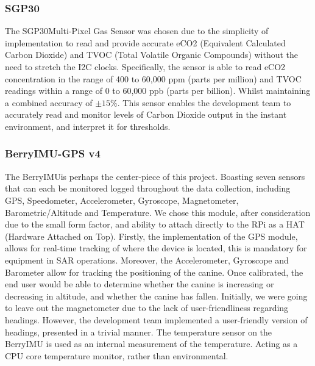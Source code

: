 \documentclass{ueacmpstyle}
\begin{document}
            
            \subsubsection{SGP30}
            The SGP30\footnotemark[2] Multi-Pixel Gas Sensor was chosen due to the simplicity of implementation to read and provide accurate eCO2 (Equivalent Calculated Carbon Dioxide) and TVOC (Total Volatile Organic Compounds) without the need to stretch the I2C clocks. Specifically, the sensor is able to read eCO2 concentration in the range of 400 to 60,000 ppm (parts per million) and TVOC readings within a range of 0 to 60,000 ppb (parts per billion). Whilst maintaining a combined accuracy of $\pm15\%$. This sensor enables the development team to accurately read and monitor levels of Carbon Dioxide output in the instant environment, and interpret it for thresholds. 
            
            \subsubsection{BerryIMU-GPS v4}
            The BerryIMU\footnotemark[3] is perhaps the center-piece of this project. Boasting seven sensors that can each be monitored logged throughout the data collection, including GPS, Speedometer, Accelerometer, Gyroscope, Magnetometer, Barometric/Altitude and Temperature. We chose this module, after consideration due to the small form factor, and ability to attach directly to the RPi as a HAT (Hardware Attached on Top). Firstly, the implementation of the GPS module, allows for real-time tracking of where the device is located, this is mandatory for equipment in SAR operations. Moreover, the Accelerometer, Gyroscope and Barometer allow for tracking the positioning of the canine. Once calibrated, the end user would be able to determine whether the canine is increasing or decreasing in altitude, and whether the canine has fallen. Initially, we were going to leave out the magnetometer due to the lack of user-friendliness regarding headings. However, the development team implemented a user-friendly version of headings, presented in a trivial manner. The temperature sensor on the BerryIMU is used as an internal measurement of the temperature. Acting as a CPU core temperature monitor, rather than environmental. 
            
            
\end{document}
